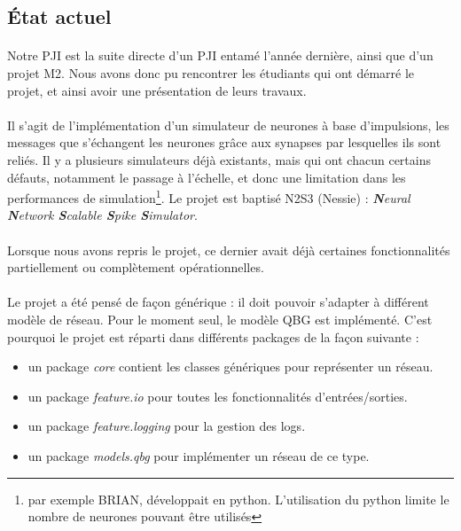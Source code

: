 \documentclass[a4paper,10pt]{article}
\begin{document}
\newpage

\subsection{État actuel}

\paragraph{}
Notre PJI est la suite directe d’un PJI entamé l’année dernière, ainsi que d’un projet M2. Nous avons donc pu rencontrer les étudiants qui ont démarré le projet, et ainsi avoir une présentation de leurs travaux.

\paragraph{}
Il s’agit de l’implémentation d’un simulateur de neurones à base d'impulsions, les messages que s’échangent les neurones grâce aux synapses par lesquelles ils sont reliés. Il y a plusieurs simulateurs déjà existants, mais qui  ont chacun certains défauts, notamment le passage à l’échelle, et donc une limitation dans les performances de simulation\footnote{par exemple BRIAN, développait en python. L'utilisation du python limite le nombre de neurones pouvant être utilisés}. Le projet est baptisé N2S3 (Nessie) : \emph{\textbf{N}eural \textbf{N}etwork \textbf{S}calable
\textbf{S}pike \textbf{S}imulator}.

\paragraph{}
Lorsque nous avons repris le projet, ce dernier avait déjà certaines fonctionnalités partiellement ou complètement opérationnelles.

\paragraph{}
Le projet a été pensé de façon générique : il doit pouvoir s’adapter à différent modèle de réseau. Pour le moment seul, le modèle QBG est implémenté. C’est pourquoi le projet est réparti dans différents packages de la façon suivante :

\begin{itemize}
	\item un package \emph{core} contient les classes génériques pour représenter un réseau.
	\item un package \emph{feature.io} pour toutes les fonctionnalités d’entrées/sorties.
	\item un package \emph{feature.logging} pour la gestion des logs.
	\item un package \emph{models.qbg} pour implémenter un réseau de ce type.
\end{itemize}
\end{document}
